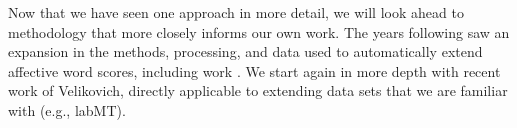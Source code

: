 {Now that we have seen one approach in more detail, we will look ahead to methodology that more closely informs our own work.
The years following saw an expansion in the methods, processing, and data used to automatically extend affective word scores, including work \citep{turney2002thumbs,turney2003measuring,taboada2004analyzing,kim2004determining,hu2004mining,esuli2006sentiwordnet,das2007yahoo,kaji2007building,blair2008building,bestgen2008building,rao2009semi}.
We start again in more depth with recent work of Velikovich, directly applicable to extending data sets that we are familiar with (e.g., labMT).\\









}
